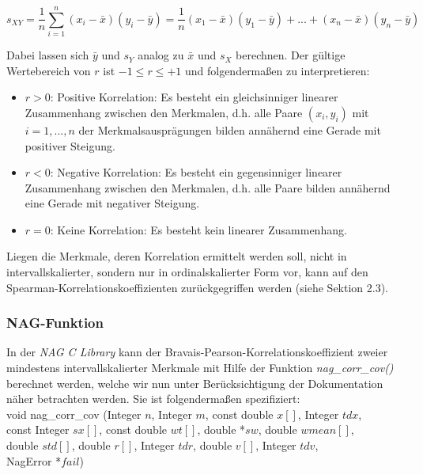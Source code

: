 \begin{equation*}
	s_{XY}=\dfrac{1}{n}\sum_{i=1}^{n}{(x_i-\bar{x})(y_i-\bar{y})}=\dfrac{1}{n}(x_1-\bar{x})(y_1-\bar{y})+...+(x_n-\bar{x})(y_n-\bar{y})
\end{equation*}

\noindent Dabei lassen sich $\bar{y}$ und $s_{Y}$ analog zu $\bar{x}$ und $s_{X}$ berechnen. Der gültige Wertebereich von $r$ ist $-1 \leq r \leq +1$ und folgendermaßen zu interpretieren:
\begin{itemize}
    \item $r>0$: Positive Korrelation: Es besteht ein gleichsinniger linearer Zusammenhang zwischen den Merkmalen, d.h. alle Paare $(x_i, y_i)$ mit $i=1,...,n$ der Merkmalsausprägungen bilden annähernd eine Gerade mit positiver Steigung.
    \item $r<0$: Negative Korrelation: Es besteht ein gegensinniger linearer Zusammenhang zwischen den Merkmalen, d.h. alle Paare bilden annähernd eine Gerade mit negativer Steigung.
    \item $r=0$: Keine Korrelation: Es besteht kein linearer Zusammenhang.
\end{itemize}

\noindent Liegen die Merkmale, deren Korrelation ermittelt werden soll, nicht in intervallskalierter, sondern nur in ordinalskalierter Form vor, kann auf den Spearman-Korrelationskoeffizienten zurückgegriffen werden (siehe Sektion 2.3).

\subsubsection{NAG-Funktion}

In der {\it NAG C Library} kann der Bravais-Pearson-Korrelationskoeffizient zweier mindestens intervallskalierter Merkmale mit Hilfe der Funktion {\it nag\_corr\_cov()} berechnet werden, welche wir nun unter Berücksichtigung der Dokumentation \cite{nag:g02bxc} näher betrachten werden. Sie ist folgendermaßen spezifiziert:\\

\noindent void nag\_corr\_cov (Integer $n$, Integer $m$, const double $x[]$, Integer $tdx$,\\
\hspace*{5mm} const Integer $sx[]$, const double $wt[]$, double *$sw$, double $wmean[]$,\\
\hspace*{5mm} double $std[]$, double $r[]$, Integer $tdr$, double $v[]$, Integer $tdv$,\\
\hspace*{5mm} NagError *$fail$)\\

